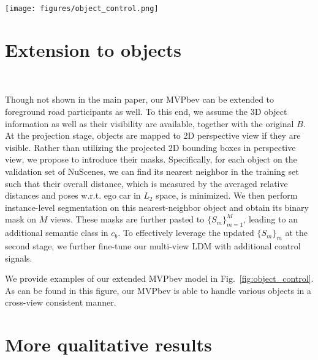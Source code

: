 \documentclass[sigconf]{acmart}
\begin{document}


\begin{figure*}[h]
\centering
\texttt{[image: figures/object\_control.png]}
\caption{We provide three sets of experiments in this figure. Specifically, the first two sets showcase the multi-view consistency ability of our MVPbev, especially on objects that have been highlighted with orange bounding boxes. The last set of examples demonstrates that MVPbev can be easily applied to multi-object setting.}
\label{fig:object_control}
\end{figure*}


\section{Extension to objects}~\label{sec:obj_details}

Though not shown in the main paper, our MVPbev can be extended to foreground road participants as well. To this end, we assume the 3D object information as well as their visibility are available, together with the original $\textit{B}$. At the projection stage, objects are mapped to 2D perspective view if they are visible. Rather than utilizing the projected 2D bounding boxes in perspective view, we propose to introduce their masks. Specifically, for each object on the validation set of NuScenes, we can find its nearest neighbor in the training set such that their overall distance, which is measured by the averaged relative distances and poses w.r.t. ego car in $L_2$ space, is minimized. We then perform instance-level segmentation on this nearest-neighbor object and obtain its binary mask on $M$ views. These masks are further pasted to $\{S_m\}_{m=1}^M$, leading to an additional semantic class in $c_b$. To effectively leverage the updated $\{S_m\}_m$ at the second stage, we further fine-tune our multi-view LDM with additional control signals.

We provide examples of our extended MVPbev model in Fig.~\ref{fig:object_control}. As can be found in this figure, our MVPbev is able to handle various objects in a cross-view consistent manner.

\section{More qualitative results}~\label{sec:qual_res}
\end{document}
